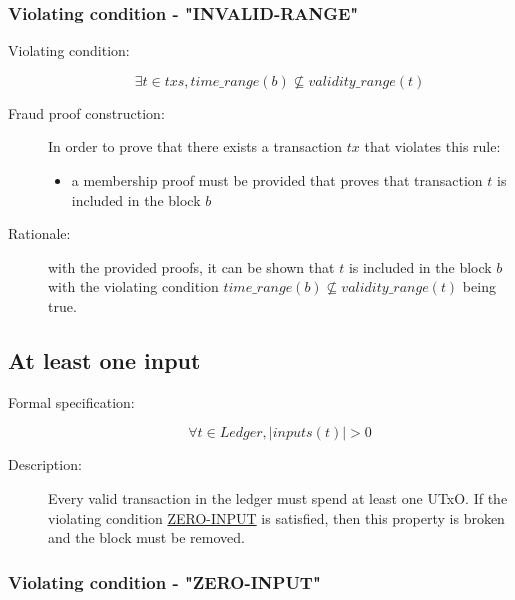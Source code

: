 \documentclass[../main.tex]{subfiles}
\begin{document}
\subsubsection{Violating condition - "INVALID-RANGE"}
\label{sec:INVALID-RANGE}

\begin{description}

\item[Violating condition:]
\begin{equation*}
    \exists t \in txs, time\_range(b) \nsubseteq validity\_range(t)
\end{equation*}

\item[Fraud proof construction:] In order to prove that there exists a transaction $tx$ that violates this rule:
\begin{itemize}
    \item a membership proof must be provided that proves that transaction $t$ is included in the block $b$
\end{itemize}

\item[Rationale:] with the provided proofs, it can be shown that $t$ is included in the block $b$ with the violating condition $time\_range(b) \nsubseteq validity\_range(t)$ being true.

\end{description}

\subsection{At least one input}

\begin{description}

\item[Formal specification:]
\begin{equation*}
    \forall t \in Ledger, |inputs(t)| > 0
\end{equation*}

\item[Description:] Every valid transaction in the ledger must spend at least one UTxO. If the violating condition \hyperref[sec:ZERO-INPUT]{ZERO-INPUT} is satisfied, then this property is broken and the block must be removed.

\end{description}

\subsubsection{Violating condition - "ZERO-INPUT"}
\label{sec:ZERO-INPUT}
\end{document}
